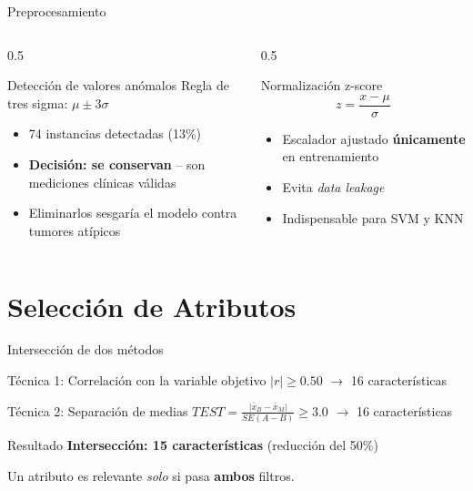 \documentclass[10pt,aspectratio=169]{beamer}
\begin{document}
\begin{frame}{Preprocesamiento}
\begin{columns}
\begin{column}{0.5\textwidth}
\begin{block}{Detección de valores anómalos}
Regla de tres sigma: $\mu \pm 3\sigma$
\begin{itemize}
  \item 74 instancias detectadas (13\%)
  \item \textbf{Decisión: se conservan} -- son mediciones clínicas válidas
  \item Eliminarlos sesgaría el modelo contra tumores atípicos
\end{itemize}
\end{block}
\end{column}

\begin{column}{0.5\textwidth}
\begin{block}{Normalización z-score}
\begin{equation*}
z = \frac{x - \mu}{\sigma}
\end{equation*}
\begin{itemize}
  \item Escalador ajustado \textbf{únicamente} en entrenamiento
  \item Evita \textit{data leakage}
  \item Indispensable para SVM y KNN
\end{itemize}
\end{block}
\end{column}
\end{columns}
\end{frame}

\section{Selección de Atributos}

\begin{frame}{Intersección de dos métodos}
\begin{block}{Técnica 1: Correlación con la variable objetivo}
$|r| \geq 0.50$ $\rightarrow$ 16 características
\end{block}

\vspace{0.5em}
\begin{block}{Técnica 2: Separación de medias}
$TEST = \frac{|\bar{x}_B - \bar{x}_M|}{SE(A-B)} \geq 3.0$ $\rightarrow$ 16 características
\end{block}

\vspace{0.5em}
\begin{alertblock}{Resultado}
\textbf{Intersección: 15 características} (reducción del 50\%)

Un atributo es relevante \textit{solo} si pasa \textbf{ambos} filtros.
\end{alertblock}
\end{frame}
\end{document}
